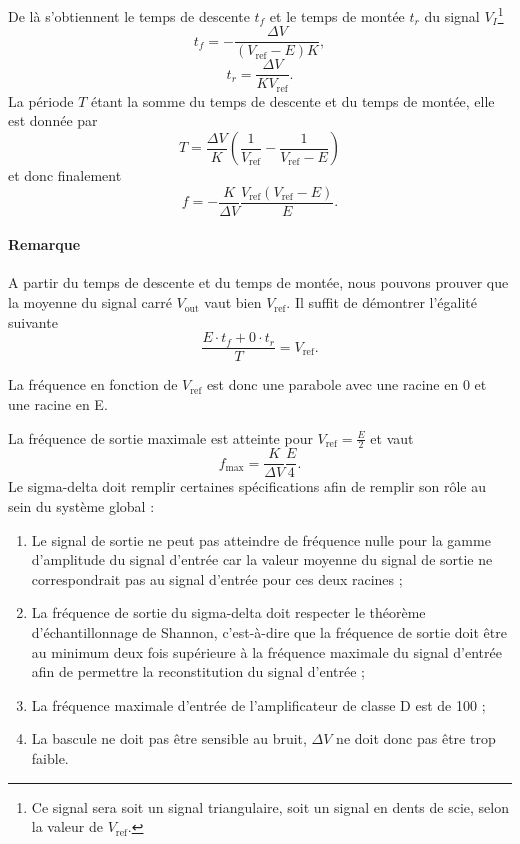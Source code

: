 De là s'obtiennent le temps de descente $t_f$ et le temps de montée $t_r$
du signal $V_I$\footnote{Ce signal sera soit un signal triangulaire,
soit un signal en dents de scie, selon la valeur de $V_{\text{ref}}$.}
\[ t_f = -\frac{\Delta V}{(V_{\text{ref}} - E)K},\]
\[ t_r = \frac{\Delta V}{KV_{\text{ref}}}.\]
La période $T$ étant la somme du temps de descente et du temps
de montée, elle est donnée par
\[ T = \frac{\Delta V}{K}\left(\frac{1}{V_{\text{ref}}} - \frac{1}{V_{\text{ref}} - E}\right) \]
et donc finalement
\begin{equation} 
	f = -\frac{K}{\Delta V} \frac{V_{\text{ref}}(V_{\text{ref}}-E)}{E}.
	\label{eq:sigma-delta-frequency}
\end{equation}

\paragraph{Remarque}
A partir du temps de descente et du temps de montée, nous
pouvons prouver que la moyenne du signal carré $V_{\text{out}}$
vaut bien $V_{\text{ref}}$. Il suffit de démontrer l'égalité
suivante
\[ \frac{E \cdot t_f + 0 \cdot t_r}{T} = V_{\text{ref}}.\]

La fréquence en fonction de $V_{\text{ref}}$ est donc
une parabole avec une racine en \unit{0}{\volt} et une
racine en \unit{E}{\volt}.

La fréquence de sortie maximale est atteinte pour 
$V_{\text{ref}} = \frac{E}{2}$ et vaut
\[ f_{\text{max}} = \frac{K}{\Delta V}\frac{E}{4}. \]
Le sigma-delta doit remplir certaines spécifications afin de remplir son rôle au sein du système global : 
\begin{enumerate}
	\item Le signal de sortie ne peut pas atteindre de fréquence nulle pour la gamme d'amplitude du signal
	d'entrée car la valeur moyenne du signal de sortie ne correspondrait pas au signal d'entrée pour ces deux racines ;
	\item La fréquence de sortie du sigma-delta doit respecter le théorème d’échantillonnage de Shannon, c'est-à-dire
	que la fréquence de sortie doit être au minimum deux fois supérieure à la fréquence maximale du signal d'entrée
	afin de permettre la reconstitution du signal d'entrée ;
	\item La fréquence maximale d'entrée de l'amplificateur de classe D est de \unit{100}{\kilo\hertz} ;
	\item La bascule ne doit pas être sensible au bruit, $\Delta V$ ne doit donc pas être trop faible.
\end{enumerate}

